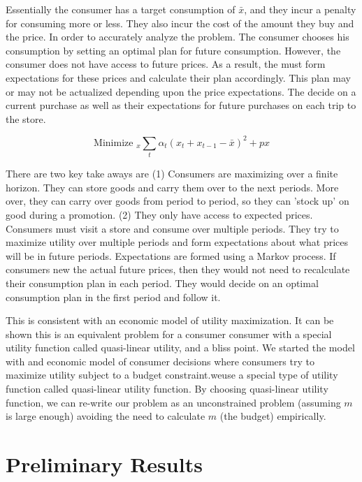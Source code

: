 \documentclass{article}
\begin{document}
Essentially the consumer has a target consumption of $\bar{x}$, and they incur a penalty for consuming more or less. They also incur the cost of the amount they buy and the price. In order to accurately analyze the problem. The consumer chooses his consumption by setting an optimal plan for future consumption. However, the consumer does not have access to future prices. As a result, the must form expectations for these prices and calculate their plan accordingly. This plan may or may not be actualized depending upon the price expectations. The decide on a current purchase as well as their expectations for future purchases on each trip to the store.

$$ \text{Minimize }_{x} \sum_t \alpha_t (x_t + x_{t-1} - \bar{x})^2 + p x $$

There are two key take aways are (1) Consumers are maximizing over a finite horizon. They can store goods and carry them over to the next periods. More over, they can carry over goods from period to period, so they can 'stock up' on good during a promotion. (2) They only have access to expected prices. Consumers must visit a store and consume over multiple periods. They try to maximize utility over multiple periods and form expectations about what prices will be in future periods. Expectations are formed using a Markov process. If consumers new the actual future prices, then they would not need to recalculate their consumption plan in each period. They would decide on an optimal consumption plan in the first period and follow it.

This is consistent with an economic model of utility maximization. It can be shown this is an equivalent problem for a consumer consumer with a special utility function called quasi-linear utility, and a bliss point. We started the model with and economic model of consumer decisions where consumers try to maximize utility subject to a budget constraint.weuse a special type of utility function called quasi-linear utility function. By choosing quasi-linear utility function, we can re-write our problem as an unconstrained problem (assuming $m$ is large enough) avoiding the need to calculate $m$ (the budget) empirically. 

\section{Preliminary Results}
\end{document}
